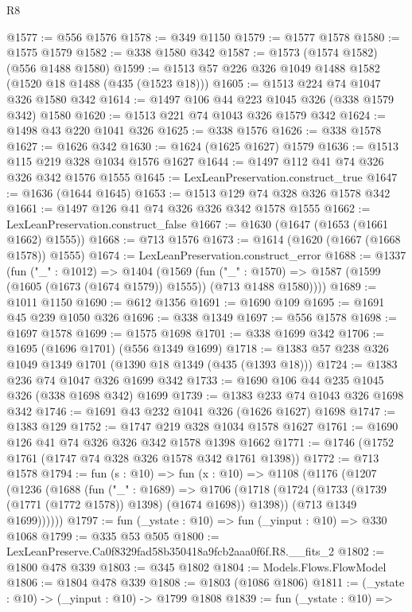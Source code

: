 \begin{lexlean}{R8}
\begin{coremodule}
@1577 := @556 @1576
@1578 := @349 @1150
@1579 := @1577 @1578
@1580 := @1575 @1579
@1582 := @338 @1580 @342
@1587 := @1573 (@1574 @1582) (@556 @1488 @1580)
@1599 := @1513 @57 @226 @326 @1049 @1488 @1582 (@1520 @18 @1488 (@435 (@1523 @18)))
@1605 := @1513 @224 @74 @1047 @326 @1580 @342
@1614 := @1497 @106 @44 @223 @1045 @326 (@338 @1579 @342) @1580
@1620 := @1513 @221 @74 @1043 @326 @1579 @342
@1624 := @1498 @43 @220 @1041 @326
@1625 := @338 @1576
@1626 := @338 @1578
@1627 := @1626 @342
@1630 := @1624 (@1625 @1627) @1579
@1636 := @1513 @115 @219 @328 @1034 @1576 @1627
@1644 := @1497 @112 @41 @74 @326 @326 @342 @1576 @1555
@1645 := LexLeanPreservation.construct_true
@1647 := @1636 (@1644 @1645)
@1653 := @1513 @129 @74 @328 @326 @1578 @342
@1661 := @1497 @126 @41 @74 @326 @326 @342 @1578 @1555
@1662 := LexLeanPreservation.construct_false
@1667 := @1630 (@1647 (@1653 (@1661 @1662) @1555))
@1668 := @713 @1576
@1673 := @1614 (@1620 (@1667 (@1668 @1578)) @1555)
@1674 := LexLeanPreservation.construct_error
@1688 := @1337
    (fun ("_" : @1012) =>
    @1404
      (@1569
        (fun ("_" : @1570) =>
        @1587 (@1599 (@1605 (@1673 (@1674 @1579)) @1555)) (@713 @1488 @1580))))
@1689 := @1011 @1150
@1690 := @612 @1356
@1691 := @1690 @109
@1695 := @1691 @45 @239 @1050 @326
@1696 := @338 @1349
@1697 := @556 @1578
@1698 := @1697 @1578
@1699 := @1575 @1698
@1701 := @338 @1699 @342
@1706 := @1695 (@1696 @1701) (@556 @1349 @1699)
@1718 := @1383 @57 @238 @326 @1049 @1349 @1701 (@1390 @18 @1349 (@435 (@1393 @18)))
@1724 := @1383 @236 @74 @1047 @326 @1699 @342
@1733 := @1690 @106 @44 @235 @1045 @326 (@338 @1698 @342) @1699
@1739 := @1383 @233 @74 @1043 @326 @1698 @342
@1746 := @1691 @43 @232 @1041 @326 (@1626 @1627) @1698
@1747 := @1383 @129
@1752 := @1747 @219 @328 @1034 @1578 @1627
@1761 := @1690 @126 @41 @74 @326 @326 @342 @1578 @1398 @1662
@1771 := @1746 (@1752 @1761 (@1747 @74 @328 @326 @1578 @342 @1761 @1398))
@1772 := @713 @1578
@1794 := fun (s : @10) =>
  fun (x : @10) =>
  @1108
    (@1176
      (@1207
        (@1236
          (@1688
            (fun ("_" : @1689) =>
            @1706
              (@1718 (@1724 (@1733 (@1739 (@1771 (@1772 @1578)) @1398) (@1674 @1698)) @1398))
              (@713 @1349 @1699))))))
@1797 := fun (_ystate : @10) => fun (_yinput : @10) => @330 @1068
@1799 := @335 @53 @505
@1800 := LexLeanPreserve.Ca0f8329fad58b350418a9fcb2aaa0f6f.R8.__fits_2
@1802 := @1800 @478 @339
@1803 := @345 @1802
@1804 := Models.Flows.FlowModel
@1806 := @1804 @478 @339
@1808 := @1803 (@1086 @1806)
@1811 := (_ystate : @10) -> (_yinput : @10) -> @1799 @1808
@1839 := fun (_ystate : @10) =>

\end{coremodule}
\end{lexlean}
